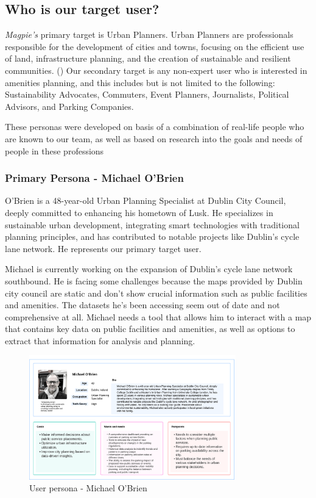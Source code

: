 \subsection{Who is our target user?}
\textit{Magpie's} primary target is Urban Planners. Urban Planners are
professionals responsible for the development of cities and towns, focusing on
the efficient use of land, infrastructure planning, and the creation of
sustainable and resilient communities. (\cite{fischler2012fifty}) Our secondary
target is any non-expert user who is interested in amenities planning, and this
includes but is not limited to the following: Sustainability Advocates,
Commuters, Event Planners, Journalists, Political Advisors, and Parking
Companies.

These personas were developed on basis of a combination of real-life people who
are known to our team, as well as based on research into the goals and needs of
people in these professions

\subsubsection{Primary Persona - Michael O'Brien}
O'Brien is a 48-year-old Urban Planning Specialist at Dublin City Council,
deeply committed to enhancing his hometown of Lusk. He specializes in
sustainable urban development, integrating smart technologies with traditional
planning principles, and has contributed to notable projects like Dublin's cycle
lane network. He represents our primary target user.

Michael is currently working on the expansion of Dublin's cycle lane network
southbound. He is facing some challenges because the maps provided by Dublin
city council are static and don't show crucial information such as public
facilities and amenities. The datasets he's been accessing seem out of date and
not comprehensive at all. Michael needs a tool that allows him to interact with
a map that contains key data on public facilities and amenities, as well as
options to extract that information for analysis and planning.

\begin{figure}[htbp]
    \centering{}{}
    \includegraphics[width=0.8\textwidth]{images/michael-obrien-userpersona.png}
    \caption{User persona - Michael O'Brien}
\end{figure}


